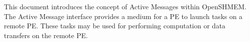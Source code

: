 
This document introduces the concept of Active 
Messages within OpenSHMEM. The Active Message
interface provides a medium for a PE to launch 
tasks on a remote PE. These tasks may be used for 
performing computation or data transfers on the 
remote PE.

